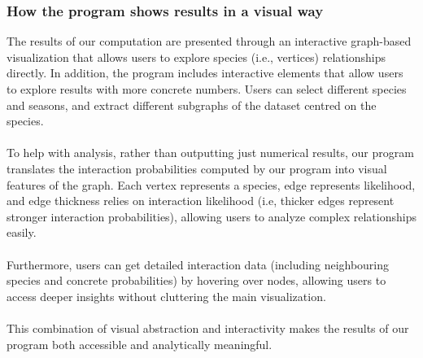 \documentclass{article}
\begin{document}
\subsubsection{How the program shows results in a visual way}
The results of our computation are presented through an interactive graph-based visualization that allows users to explore species (i.e., vertices) relationships directly. In addition, the program includes interactive elements that allow users to explore results with more concrete numbers. Users can select different species and seasons, and extract different subgraphs of the dataset centred on the species. \\ \\
To help with analysis, rather than outputting just numerical results, our program translates the interaction probabilities computed by our program into visual features of the graph. Each vertex represents a species, edge represents likelihood, and edge thickness relies on interaction likelihood (i.e, thicker edges represent stronger interaction probabilities), allowing users to analyze complex relationships easily. \\ \\
Furthermore, users can get detailed interaction data (including neighbouring species and concrete probabilities) by hovering over nodes, allowing users to access deeper insights without cluttering the main visualization. \\ \\
This combination of visual abstraction and interactivity makes the results of our program both accessible and analytically meaningful. \\
\end{document}
